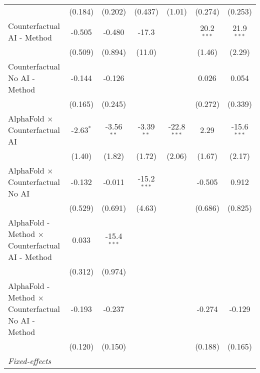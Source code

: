 \begin{tabular}{lcccccc}
                                                              & (0.184)      & (0.202)       & (0.437)       & (1.01)        & (0.274)      & (0.253)\\   
   Counterfactual AI - Method                                 & -0.505       & -0.480        & -17.3         &               & 20.2$^{***}$ & 21.9$^{***}$\\   
                                                              & (0.509)      & (0.894)       & (11.0)        &               & (1.46)       & (2.29)\\   
   Counterfactual No AI - Method                              & -0.144       & -0.126        &               &               & 0.026        & 0.054\\   
                                                              & (0.165)      & (0.245)       &               &               & (0.272)      & (0.339)\\   
   AlphaFold $\times$ Counterfactual AI                       & -2.63$^{*}$  & -3.56$^{**}$  & -3.39$^{**}$  & -22.8$^{***}$ & 2.29         & -15.6$^{***}$\\   
                                                              & (1.40)       & (1.82)        & (1.72)        & (2.06)        & (1.67)       & (2.17)\\   
   AlphaFold $\times$ Counterfactual No AI                    & -0.132       & -0.011        & -15.2$^{***}$ &               & -0.505       & 0.912\\   
                                                              & (0.529)      & (0.691)       & (4.63)        &               & (0.686)      & (0.825)\\   
   AlphaFold - Method $\times$ Counterfactual AI - Method     & 0.033        & -15.4$^{***}$ &               &               &              &   \\   
                                                              & (0.312)      & (0.974)       &               &               &              &   \\   
   AlphaFold - Method $\times$ Counterfactual No AI - Method  & -0.193       & -0.237        &               &               & -0.274       & -0.129\\   
                                                              & (0.120)      & (0.150)       &               &               & (0.188)      & (0.165)\\   
   \midrule
   \emph{Fixed-effects}\\

\end{tabular}

